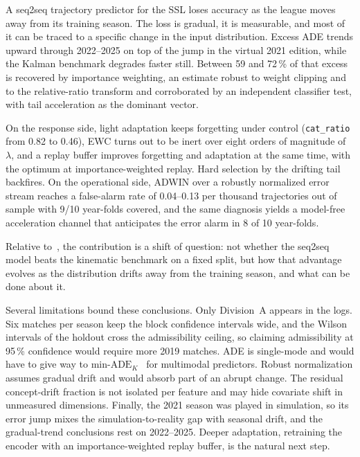 \documentclass[conference]{IEEEtran}
\newif\ifmarkchanges
\newcommand{\chg}[1]{\ifmarkchanges\hl{#1}\else#1\fi}
\begin{document}
A seq2seq trajectory predictor for the SSL loses accuracy as the league moves
away from its training season. The loss is gradual, it is measurable, and most
of it can be traced to a specific change in the input distribution. Excess ADE
trends upward through 2022--2025 \chg{on top of the jump in the virtual 2021
edition, while the Kalman benchmark degrades faster still.}
Between 59 and 72\,\% of that excess is recovered by importance weighting, an
estimate robust to weight clipping and to the relative-ratio transform and
corroborated by an independent classifier test, with tail acceleration as the
dominant vector.

On the response side, light adaptation keeps forgetting under control
(\texttt{cat\_ratio} from 0.82 to 0.46), EWC turns out to be inert over eight
orders of magnitude of $\lambda$, and a replay buffer improves forgetting and
adaptation at the same time, with the optimum at importance-weighted replay.
Hard selection by the drifting tail backfires. On the operational side, ADWIN
over a robustly normalized error stream reaches a false-alarm rate of
0.04--0.13 per thousand trajectories out of sample with 9/10 year-folds
covered, and the same diagnosis yields a model-free acceleration channel that
anticipates the error alarm in 8 of 10 year-folds.

\chg{Relative to\mbox{~\cite{seq2seq}}, the contribution is a shift of question:
not whether the seq2seq model beats the kinematic benchmark on a fixed split,
but how that advantage evolves as the distribution drifts away from the
training season, and what can be done about it.}

Several limitations bound these conclusions. Only Division~A appears in the
logs. Six matches per season keep the block confidence intervals wide, and the
Wilson intervals of the holdout cross the admissibility ceiling, so claiming
admissibility at 95\,\% confidence would require more 2019 matches. ADE is
single-mode and would have to give way to
$\text{min-ADE}_K$~\cite{salzmann2020,yuan2021} for multimodal predictors.
Robust normalization assumes gradual drift and would absorb part of an abrupt
change. The residual concept-drift fraction is not isolated per feature and may
hide covariate shift in unmeasured dimensions. Finally, the 2021 season was
played in simulation, so its error jump mixes the
\chg{simulation-to-reality gap} with seasonal drift, and the gradual-trend
conclusions rest on 2022--2025.
Deeper adaptation, retraining the encoder with an importance-weighted replay
buffer, is the natural next step.




\end{document}

